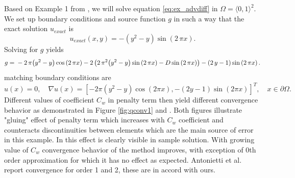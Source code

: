 \begin{example}
\label{ex:quart1}
Based on Example 1 from \cite{Antonietti2013},
we will solve equation \eqref{eq:ex_advdiff} in $\Omega = \langle 0, 1 \rangle^2$.
We set up boundary conditions and source function $g$ in such a way that 
the exact solution $u_{exact}$ is
\begin{equation}
	u_{exact}(x,y) =  -{\left(y^{2} - y\right)} \sin\left(2 \, \pi x\right).
\end{equation}
Solving for $g$ yields
\begin{equation}
	g = \\
	 -2 \, \pi {\left(y^{2} - y\right)} \cos\left(2 \, \pi x\right) - 2 \, {\left(2 \, 
	 \pi^{2} 
	{\left(y^{2} - y\right)} \sin\left(2 \, \pi x\right) - D\sin\left(2 \, \pi 
	x\right)\right)} 
	 - {\left(2 \, y - 1\right)} \sin\left(2 \, \pi x\right).
\end{equation}
matching  boundary conditions are
\begin{equation}
u(x) = 0, \quad \nabla u(x) = [-2\pi(y^2 - y)\cos(2 \pi x), -(2 y - 1)\sin(2\pi  x)]^T, 
\quad x \in \partial\Omega.
\end{equation}
Different values of coefficient $C_w$ in penalty term then yield different 
convergence behavior as demonstrated in Figure \ref{fig:qconv1} and 
. Both figures illustrate "gluing" effect of penalty term 
which increases with $C_w$ coefficient and counteracts discontinuities between elements 
which are the main source of error in this example. In  this effect 
is clearly visible in sample solution. With growing value of $C_w$ convergence 
behavior of the method improves, with exception of 0th order approximation for which it 
has no effect as expected. Antonietti et al. \cite{Antonietti2013} report convergence for 
order 1 and 2, these are in accord with ours. 


\end{example}
